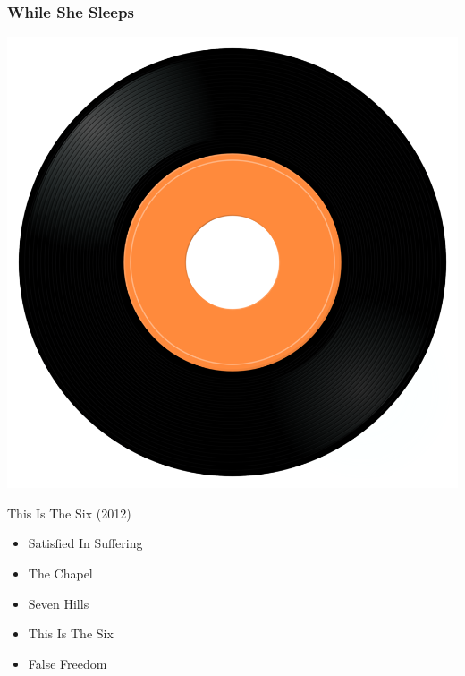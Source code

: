 \subsubsection{While She Sleeps}

\begin{minipage}[t]{0.25\textwidth}
\captionsetup{type=figure}
\includegraphics[width=\textwidth]{Images/cover.png}
\caption*{This Is The Six (2012)}
\end{minipage}
\begin{minipage}[t]{0.25\textwidth}\vspace{0pt}
\begin{itemize}[nosep,leftmargin=1em,labelwidth=*,align=left]
	\setlength{\itemsep}{0pt}
	\item Satisfied In Suffering
	\item The Chapel
	\item Seven Hills
	\item This Is The Six
	\item False Freedom
\end{itemize}
\end{minipage}
